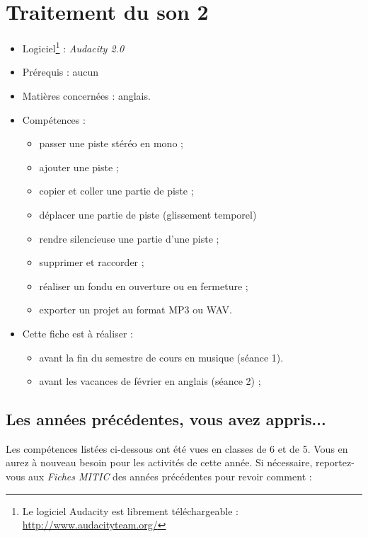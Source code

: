 \chapter{Traitement du son 2}  


{\footnotesize
\begin{itemize}
\item Logiciel\footnote{Le logiciel Audacity est librement téléchargeable : \url{http://www.audacityteam.org/}} : \emph{Audacity 2.0} 
\item Prérequis : aucun
\item Matières concernées : anglais.
\item Compétences : 
        \begin{itemize}
        \item passer une piste stéréo en mono ;
        \item ajouter une piste ;
        \item copier et coller une partie de piste ;
        \item déplacer une partie de piste (glissement temporel)
        \item rendre silencieuse une partie d'une piste ;
        \item supprimer et raccorder ;
        \item réaliser un fondu en ouverture ou en fermeture ;
        \item exporter un projet au format MP3 ou WAV.
        \end{itemize}
\item Cette fiche est à réaliser :
        \begin{itemize}
	\item avant la fin du semestre de cours en musique (séance 1).
        \item avant les vacances de février en anglais (séance 2) ; 
        \end{itemize}
\end{itemize}
}%


\section*{Les années précédentes, vous avez appris...}

Les compétences listées ci-dessous ont été vues en classes de 6 et de 5. Vous en aurez à nouveau besoin pour les activités de cette année. Si nécessaire, reportez-vous aux \emph{Fiches MITIC} des années précédentes pour revoir comment :  

